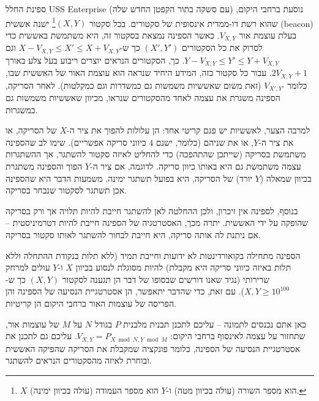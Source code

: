 \documentclass[12pt]{article}
\begin{document}
\renewcommand{\headerLang}{עברית}
\renewcommand{\problemName}{AB13. אור}

\renewcommand{\headerLeft}{IATI יום 1, קבוצת בוגרים}
\renewcommand{\headerRightFirst}{הטורניר הבינלאומי המתקדם ה-17 במדעי המחשב}
\renewcommand{\headerRightSecond}{אונליין 2026}

\renewcommand{\tl}{$5$ שניות}
\renewcommand{\ml}{$1024$ MB}
\problem{בעיה \problemName}

ספינת החלל USS Enterprise (עם סשקה בתור הקפטן החדש שלה) נוסעת ברחבי היקום, שהוא רשת דו-ממדית אינסופית של סקטורים. בכל סקטור $(X, Y)$\footnote{$X$ הוא מספר השורה (עולה בכיוון מטה) ו-$Y$ הוא מספר העמודה (עולה בכיוון ימינה).} ישנה אששית (beacon) בעלת עוצמת אור $V_{X, Y}$. כאשר הספינה נמצאת בסקטור זה, היא משתמשת באששית כדי לסרוק את כל הסקטורים $(X', Y')$ כך ש-$X - V_{X, Y} \leq X' \leq X + V_{X, Y}$ וגם $Y - V_{X, Y} \leq Y' \leq Y + V_{X, Y}$. כך, הסקטורים הנראים יוצרים ריבוע בעל צלע באורך $2V_{X, Y} + 1$. עבור כל סקטור כזה, המידע היחיד שנראה הוא עוצמת האור של האששית שבו, כלומר $V_{X', Y'}$ (זאת משום שאששיות משמשות גם כמשדרות וגם כמקלטות). לאחר הסריקה, הספינה משגרת את עצמה לאחד מהסקטורים שנראו, מכיוון שאששיות משמשות גם כמשגרות.

למרבה הצער, לאששיות יש פגם קריטי אחד: הן עלולות להפוך את ציר ה-$X$ של הסריקה, או את ציר ה-$Y$, או את שניהם (כלומר, ישנם $4$ כיווני סריקה אפשריים). שימו לב שהספינה משתמשת בסריקה (שייתכן שהתהפכה) כדי להחליט לאיזה סקטור להשתגר, אך ההשתגרות עצמה משתמשת גם היא באותו כיוון סריקה. לדוגמה, אם ציר ה-$Y$ הפוך והספינה משתגרת בכיוון שמאלה ($Y$ יורד) של הסריקה, היא בפועל תשתגר ימינה. משמעות הדבר היא שהספינה אכן תשתגר לסקטור שנבחר בסריקה.

בנוסף, לספינה אין זיכרון, ולכן ההחלטה לאן להשתגר חייבת להיות תלויה אך ורק בסריקה שהופקה על ידי האששית. יתרה מכך, האסטרטגיה של הספינה חייבת להיות דטרמיניסטית -- אם ניתנת לה אותה סריקה, היא חייבת לבחור להשתגר לאותו סקטור בסריקה.

הספינה מתחילה בקואורדינטות לא ידועות וחייבת תמיד (ללא תלות בנקודת ההתחלה וללא תלות באיזה כיווני סריקה היא מקבלת) להיות מסוגלת לנסוע בכיוון $X$ ו-$Y$ עולים למרחק שרירותי (נגיד שאנו דורשים שבסופו של דבר הן תגענה לסקטור $(X, Y)$ כך ש-$X, Y \geq 10^{100}$). עם זאת, כדי שהדבר יתאפשר, הן אסטרטגיית הנסיעה של הספינה והן הפריסה של עוצמות האור ברחבי היקום הן קריטיות.

כאן אתם נכנסים לתמונה -- עליכם לתכנן תבנית מלבנית $P$ בגודל $N$ על $M$ של עוצמות אור, שתחזור על עצמה לאינסוף ברחבי היקום: $V_{X, Y} = P_{X \bmod N, Y \bmod M}$. עליכם גם לתכנן את אסטרטגיית הנסיעה של הספינה, כלומר פונקציה שמקבלת את הסריקה שהפיקה האששית ובוחרת לאיזה מהסקטורים הנראים להשתגר.
\end{document}
